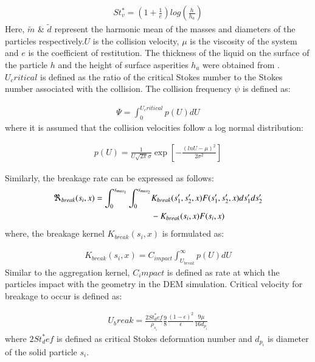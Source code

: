 \documentclass[preprint,10pt,authoryear,review]{elsarticle}
\begin{document}
\begin{linenumbers}
\begin{align}
St^*_v=\left(1+\frac{1}{e}\right)log\left(\frac{h}{h_a}\right)
\label{eqn:mthds_pbm_agg_cricSt}
\end{align}
Here, $\tilde{m}$ \& $\tilde{d}$ represent the harmonic mean of the masses and 
diameters of the particles respectively.$U$ is the collision velocity, $\mu$ is the 
viscosity of the system and $e$ is the coefficient of restitution. The thickness of 
the liquid on the surface of the particle $h$ and the height of surface asperities 
$h_a$ were obtained from \citep{Barrasso2015ces}. $U_critical$ is defined as the 
ratio of the critical Stokes number to the Stokes number associated with the collision. 
The collision frequency $\psi$ is defined as:

\begin{align}
\Psi = \int_0^{U_critical} p(U)dU
\label{eqn:mthds_pbm_agg_psi}
\end{align}
where it is assumed that the collision velocities follow a log normal distribution:


\begin{align}
p(U) = \frac{1}{U\sqrt{2\pi}\sigma}\exp\left[-\frac{(lnU-\mu)^2}{2\sigma^2}\right]
\label{eqn:mthds_pbm_agg_lognormVelo}
\end{align}

Similarly, the breakage rate can be expressed as follows:
\begin{align}
\Re_{break}(s_i,x)  = \int_0^{s_{max_1}} \int_0^{s_{max_2}} & \notag
K_{break}(s_1',s_2',x)F(s_1',s_2',x)ds_1'ds_2' \\ &  - K_{break}(s_i,x)F(s_i,x) 
\label{eqn:mthds_pbm_breakage_geneq}
\end{align}   
where, the breakage kernel $K_{break}(s_i,x)$ is formulated as: 

\begin{align}
K_{break}(s_i,x) = C_{impact}\int_{U_{break}}^{\infty}p(U)dU
\label{eqn:mthds_pbm_breakage_kernel}
\end{align}
Similar to the aggregation kernel, $C_impact$ is defined as rate at which 
the particles impact with the geometry in the DEM simulation. Critical velocity 
for breakage to occur is defined as:

\begin{align}
U_break=\frac{2St^*_def}{\rho_{s_i}}\frac{9}{8}\frac{(1-\epsilon)^2}{\epsilon}\frac{9\mu}{16d_{p_i}}
\label{eqn:mthds_pbm_breakage_ubreak}
\end{align}
where $2St^*_def$ is defined as critical Stokes deformation number \citep{Iveson2001} and 
$d_{p_i}$ is diameter of the solid particle $s_i$.



\end{linenumbers}
\end{document}
